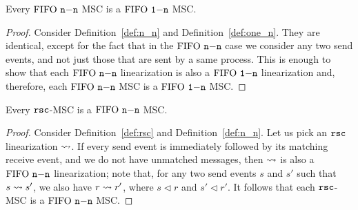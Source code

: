 	\begin{proposition} \label{prop:nn_is_onen}
		Every $\text{FIFO } \mathtt{n\mathsf{-}n}$ MSC is a $\text{FIFO } \mathtt{1\mathsf{-}n}$ MSC.
	\end{proposition}
	\begin{proof}
		Consider Definition~\ref{def:n_n} and Definition~\ref{def:one_n}. They are identical, except for the fact that in the $\text{FIFO } \mathtt{n\mathsf{-}n}$ case we consider any two send events, and not just those that are sent by a same process. This is enough to show that each $\text{FIFO } \mathtt{n\mathsf{-}n}$ linearization is also a $\text{FIFO } \mathtt{1\mathsf{-}n}$ linearization and, therefore, each $\text{FIFO } \mathtt{n\mathsf{-}n}$ MSC is a $\text{FIFO } \mathtt{1\mathsf{-}n}$ MSC.
	\end{proof}
	
	\begin{proposition} \label{prop:rsc_is_nn}
		Every $\mathtt{rsc}$-MSC is a $\text{FIFO } \mathtt{n\mathsf{-}n}$ MSC.
	\end{proposition}
	\begin{proof}
		Consider Definition~\ref{def:rsc} and Definition~\ref{def:n_n}. Let us pick an $\mathtt{rsc}$ linearization $\rightsquigarrow$. If every send event is immediately followed by its matching receive event, and we do not have unmatched messages, then $\rightsquigarrow$ is also a $\text{FIFO } \mathtt{n\mathsf{-}n}$ linearization; note that, for any two send events $s$ and $s'$ such that $s \rightsquigarrow s'$, we also have $r \rightsquigarrow r'$, where $s \lhd r$ and $s' \lhd r'$. It follows that each $\mathtt{rsc}$-MSC is a $\text{FIFO } \mathtt{n\mathsf{-}n}$ MSC.
	\end{proof}
	